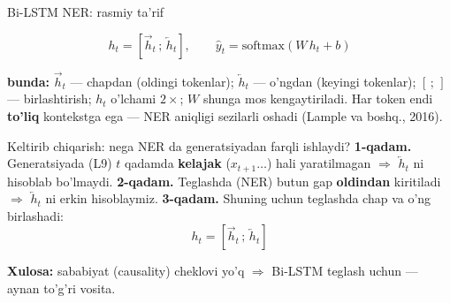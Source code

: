 \documentclass[aspectratio=169,11pt]{beamer}
\newcommand{\bunda}[1]{{\small\textbf{bunda:}\; #1}}
\begin{document}
\begin{frame}{Bi-LSTM NER: rasmiy ta'rif}
  \begin{tcolorbox}[defbox,title=Ta'rif: ikki tomonlama teglash]
    \vspace{-0.4em}
    $$ h_t = [\overrightarrow{h}_t \,;\, \overleftarrow{h}_t], \qquad
       \hat{y}_t = \mathrm{softmax}(W\,h_t + b) $$
  \end{tcolorbox}
  \vspace{2pt}
  \bunda{$\overrightarrow{h}_t$ --- chapdan (oldingi tokenlar); $\overleftarrow{h}_t$
  --- o'ngdan (keyingi tokenlar); $[\,;\,]$ --- birlashtirish; $h_t$ o'lchami
  $2\times$; $W$ shunga mos kengaytiriladi.}
  \vspace{4pt}
  \footnotesize Har token endi \textbf{to'liq} kontekstga ega --- NER aniqligi
  sezilarli oshadi (Lample va boshq., 2016).
\end{frame}

\begin{frame}{Keltirib chiqarish: nega NER da generatsiyadan farqli ishlaydi?}
  \textbf{1-qadam.} Generatsiyada (L9) $t$ qadamda \textbf{kelajak} ($x_{t+1}\ldots$)
  hali yaratilmagan $\Rightarrow$ $\overleftarrow{h}_t$ ni hisoblab bo'lmaydi.
  \pause
  \textbf{2-qadam.} Teglashda (NER) butun gap \textbf{oldindan} kiritiladi
  $\Rightarrow$ $\overleftarrow{h}_t$ ni erkin hisoblaymiz.
  \pause
  \textbf{3-qadam.} Shuning uchun teglashda chap va o'ng birlashadi:
  $$ h_t = [\overrightarrow{h}_t \,;\, \overleftarrow{h}_t] $$
  \begin{tcolorbox}[okbox,top=2pt,bottom=2pt]
    \small \textbf{Xulosa:} sababiyat (causality) cheklovi yo'q $\Rightarrow$ Bi-LSTM
    teglash uchun --- aynan to'g'ri vosita.
  \end{tcolorbox}
\end{frame}
\end{document}
